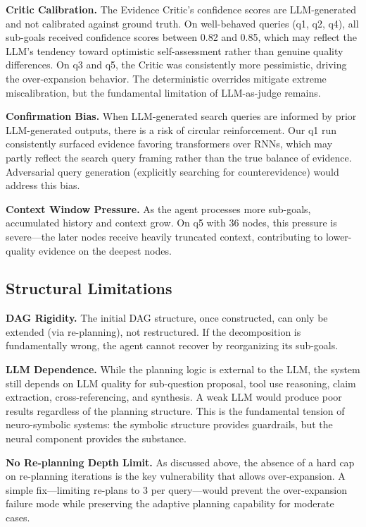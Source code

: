 \documentclass[11pt]{article}
\begin{document}
\textbf{Critic Calibration.} The Evidence Critic's confidence scores are LLM-generated and not calibrated against ground truth. On well-behaved queries (q1, q2, q4), all sub-goals received confidence scores between 0.82 and 0.85, which may reflect the LLM's tendency toward optimistic self-assessment rather than genuine quality differences. On q3 and q5, the Critic was consistently more pessimistic, driving the over-expansion behavior. The deterministic overrides mitigate extreme miscalibration, but the fundamental limitation of LLM-as-judge remains.

\textbf{Confirmation Bias.} When LLM-generated search queries are informed by prior LLM-generated outputs, there is a risk of circular reinforcement. Our q1 run consistently surfaced evidence favoring transformers over RNNs, which may partly reflect the search query framing rather than the true balance of evidence. Adversarial query generation (explicitly searching for counterevidence) would address this bias.

\textbf{Context Window Pressure.} As the agent processes more sub-goals, accumulated history and context grow. On q5 with 36 nodes, this pressure is severe---the later nodes receive heavily truncated context, contributing to lower-quality evidence on the deepest nodes.

\subsection{Structural Limitations}

\textbf{DAG Rigidity.} The initial DAG structure, once constructed, can only be extended (via re-planning), not restructured. If the decomposition is fundamentally wrong, the agent cannot recover by reorganizing its sub-goals.

\textbf{LLM Dependence.} While the planning logic is external to the LLM, the system still depends on LLM quality for sub-question proposal, tool use reasoning, claim extraction, cross-referencing, and synthesis. A weak LLM would produce poor results regardless of the planning structure. This is the fundamental tension of neuro-symbolic systems: the symbolic structure provides guardrails, but the neural component provides the substance.

\textbf{No Re-planning Depth Limit.} As discussed above, the absence of a hard cap on re-planning iterations is the key vulnerability that allows over-expansion. A simple fix---limiting re-plans to 3 per query---would prevent the over-expansion failure mode while preserving the adaptive planning capability for moderate cases.
\end{document}

